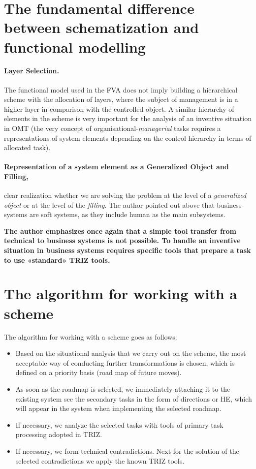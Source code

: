 \documentclass[11pt,a4paper]{book}
\begin{document}
\section{The fundamental difference between schematization and functional
  modelling} 

\paragraph{Layer Selection.}
The functional model used in the FVA does not imply building a hierarchical
scheme with the allocation of layers, where the subject of management is in a
higher layer in comparison with the controlled object. A similar hierarchy of
elements in the scheme is very important for the analysis of an inventive
situation in OMT (the very concept of organisational-\emph{managerial} tasks
requires a representations of system elements depending on the control hierarchy
in terms of allocated task).

\paragraph{Representation of a system element as a Generalized Object and
  Filling, }
clear realization whether we are solving the problem at the level of a
\emph{generalized object} or at the level of the \emph{filling}. The author
pointed out above that business systems are soft systems, as they include
human as the main subsystems.

\textbf{The author emphasizes once again that a simple tool transfer from
  technical to business systems is not possible. To handle an inventive
  situation in business systems requires specific tools that prepare a task to
  use «standard» TRIZ tools.}

\section{The algorithm for working with a scheme}

The algorithm for working with a scheme goes as follows:
\begin{itemize}
\item Based on the situational analysis that we carry out on the scheme, the
  most acceptable way of conducting further transformations is chosen, which
  is defined on a priority basis (road map of future moves).
\item As soon as the roadmap is selected, we immediately attaching it to the
  existing system see the secondary tasks in the form of directions or HE,
  which will appear in the system when implementing the selected roadmap.
\item If necessary, we analyze the selected tasks with tools of primary task
  processing adopted in TRIZ.
\item If necessary, we form technical contradictions.  Next for the solution
  of the selected contradictions we apply the known TRIZ tools.
\end{itemize}
\end{document}
